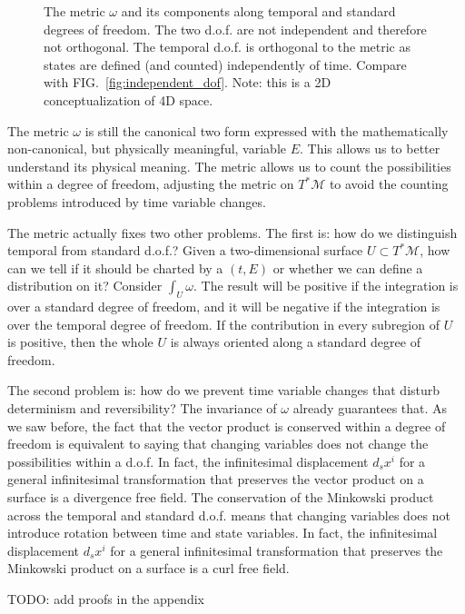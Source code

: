 \documentclass[aps,pra,10pt,twocolumn,floatfix,nofootinbib]{revtex4-1}
\numberwithin{equation}{section}
\theoremstyle{definition}
\begin{document}
\begin{figure}
	
	\caption{The metric $\omega$ and its components along temporal and standard degrees of freedom. The two d.o.f. are not independent and therefore not orthogonal. The temporal d.o.f. is orthogonal to the metric as states are defined (and counted) independently of time. Compare with FIG.~\ref{fig:independent_dof}. Note: this is a 2D conceptualization of 4D space.}
	\label{fig:temporal_dof}
\end{figure}

The metric $\omega$ is still the canonical two form expressed with the mathematically non-canonical, but physically meaningful, variable $E$. This allows us to better understand its physical meaning. The metric allows us to count the possibilities within a degree of freedom, adjusting the metric on $T^*\mathcal{M}$ to avoid the counting problems introduced by time variable changes.

The metric actually fixes two other problems. The first is: how do we distinguish temporal from standard d.o.f.? Given a two-dimensional surface $U \subset T^*\mathcal{M}$, how can we tell if it should be charted by a $(t,E)$ or whether we can define a distribution on it? Consider $\int_U \omega$. The result will be positive if the integration is over a standard degree of freedom, and it will be negative if the integration is over the temporal degree of freedom. If the contribution in every subregion of $U$ is positive, then the whole $U$ is always oriented along a standard degree of freedom.

The second problem is: how do we prevent time variable changes that disturb determinism and reversibility? The invariance of $\omega$ already guarantees that. As we saw before, the fact that the vector product is conserved within a degree of freedom is equivalent to saying that changing variables does not change the possibilities within a d.o.f. In fact, the infinitesimal displacement $d_s x^i$ for a general infinitesimal transformation that preserves the vector product on a surface is a divergence free field. The conservation of the Minkowski product across the temporal and standard d.o.f. means that changing variables does not introduce rotation between time and state variables. In fact, the infinitesimal displacement $d_s x^i$ for a general infinitesimal transformation that preserves the Minkowski product on a surface is a curl free field.

TODO: add proofs in the appendix
\end{document}
